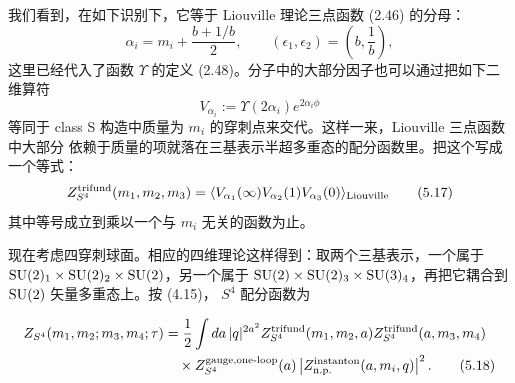 我们看到，在如下识别下，它等于 Liouville 理论三点函数 (2.46) 的分母：
\begin{equation}
\alpha_i=m_i+\frac{b+1/b}{2},\qquad(\epsilon_1,\epsilon_2)=\left(b,\frac{1}{b}\right),
\tag{5.15}
\end{equation}
这里已经代入了函数 $\Upsilon$ 的定义 (2.48)。分子中的大部分因子也可以通过把如下二维算符
\begin{equation}
V_{\alpha_i}:=\Upsilon(2\alpha_i)e^{2\alpha_i\phi}
\tag{5.16}
\end{equation}
等同于 class S 构造中质量为 $m_i$ 的穿刺点来交代。这样一来，Liouville 三点函数中大部分
依赖于质量的项就落在三基表示半超多重态的配分函数里。把这个写成一个等式：
\begin{equation}
Z^{\text{trifund}}_{S^4}(m_1,m_2,m_3)=\langle V_{\alpha_1}(\infty)V_{\alpha_2}(1)
V_{\alpha_3}(0)\rangle_{\mathrm{Liouville}}
\tag{5.17}
\end{equation}
其中等号成立到乘以一个与 $m_i$ 无关的函数为止。

现在考虑四穿刺球面。相应的四维理论这样得到：取两个三基表示，一个属于
$\mathrm{SU}(2)_1\times\mathrm{SU}(2)_2\times\mathrm{SU}(2)$，另一个属于
$\mathrm{SU}(2)\times\mathrm{SU}(2)_3\times\mathrm{SU}(3)_4$，再把它耦合到 $\mathrm{SU}(2)$ 矢量多重态上。按 (4.15)，
$S^4$ 配分函数为


\begin{align}
Z_{S^4}(m_1,m_2;m_3,m_4;\tau)&=\frac{1}{2}\int da\,|q|^{2a^2}
Z^{\text{trifund}}_{S^4}(m_1,m_2,a)Z^{\text{trifund}}_{S^4}(a,m_3,m_4)\notag\\
&\quad\times Z^{\text{gauge,one-loop}}_{S^4}(a)\left|Z^{\text{instanton}}_{\text{n.p.}}
(a,m_i,q)\right|^2.
\tag{5.18}
\end{align}

